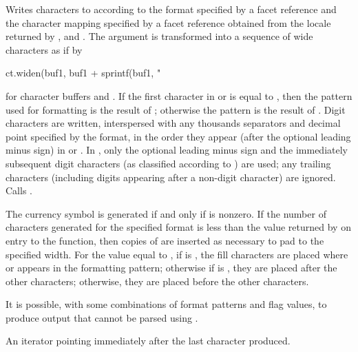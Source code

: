 \begin{itemdescr}
\pnum
\effects
Writes characters to
according to the format specified by a
facet reference
and the character mapping specified by a
facet reference
obtained from the locale returned by
,
and
.
The argument
is transformed into a sequence of wide characters as if by
\begin{codeblock}
ct.widen(buf1, buf1 + sprintf(buf1, "%
\end{codeblock}
for character buffers
and
.
If the first character in
or
is equal to
,
then the pattern used for formatting is the result of
;
otherwise the pattern is the result of
.
Digit characters are written, interspersed with any thousands separators
and decimal point specified by the format, in the order they appear
(after the optional leading minus sign)
in
or
.
In
,
only the optional leading minus sign and the immediately subsequent
digit characters (as classified according to
)
are used; any trailing characters (including digits appearing
after a non-digit character) are ignored.
Calls
.

\pnum
\remarks
The currency symbol is generated if and only if
is nonzero.
If the number of characters generated for the specified format is less than the value
returned by
on entry to the function, then copies of
are inserted as necessary to pad to the specified width.
For the value
equal to
,
if
is , the fill characters are placed where
or
appears in the formatting pattern; otherwise if
is , they are placed after the other characters;
otherwise, they are placed before the other characters.
\begin{note}
It is possible, with some combinations of format patterns and flag values,
to produce output that cannot be parsed using
.
\end{note}

\pnum
\returns
An iterator pointing immediately after the last character produced.
\end{itemdescr}

